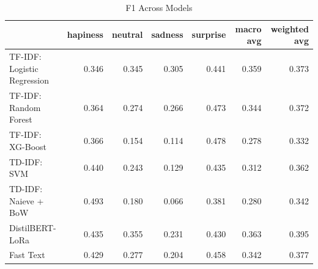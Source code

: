 \begin{table}
\caption{F1 Across Models}
\begin{tabular}{lrrrrrr}
\toprule
 & hapiness & neutral & sadness & surprise & macro avg & weighted avg \\
\midrule
TF-IDF: Logistic Regression & 0.346 & 0.345 & 0.305 & 0.441 & 0.359 & 0.373 \\
TF-IDF: Random Forest & 0.364 & 0.274 & 0.266 & 0.473 & 0.344 & 0.372 \\
TF-IDF: XG-Boost & 0.366 & 0.154 & 0.114 & 0.478 & 0.278 & 0.332 \\
TD-IDF: SVM & 0.440 & 0.243 & 0.129 & 0.435 & 0.312 & 0.362 \\
TD-IDF: Naieve + BoW & 0.493 & 0.180 & 0.066 & 0.381 & 0.280 & 0.342 \\
DistilBERT-LoRa & 0.435 & 0.355 & 0.231 & 0.430 & 0.363 & 0.395 \\
Fast Text & 0.429 & 0.277 & 0.204 & 0.458 & 0.342 & 0.377 \\
\bottomrule
\end{tabular}
\end{table}
